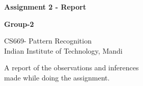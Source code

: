 \documentclass{report}
\begin{document}
	
	\begin{titlepage}
		\begin{center}
			\vspace*{1cm}
			
			\Huge
			\textbf{Assignment 2 - Report}
			
			\vspace{1cm}
			\Large
			\textbf{Group-2}
			
			\vspace{1.5cm}
			\large
			CS669- Pattern Recognition\\
			Indian Institute of Technology, Mandi
			
			\vfill
			
			\large
			A report of the observations and inferences\\
			made while doing the assignment.
			
			\vspace{0.8cm}
			\normalsize
			
			\makeatletter\@date
			
			
		\end{center}
	\end{titlepage}
	\newpage
	
\end{document}
